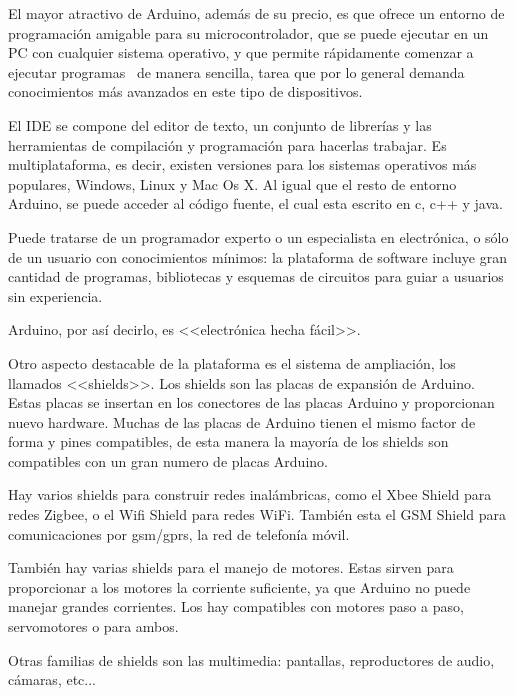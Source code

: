 El mayor atractivo de Arduino, además de su precio, es que ofrece un entorno de programación amigable para su microcontrolador, que se puede ejecutar en un PC con cualquier sistema operativo, y que permite rápidamente comenzar a ejecutar programas \ de manera sencilla, tarea que por lo general demanda conocimientos más avanzados en este tipo de dispositivos. 



El IDE se compone del editor de texto, un conjunto de librerías y las herramientas de compilación y programación para hacerlas trabajar. Es multiplataforma, es decir, existen versiones para los sistemas operativos más populares, Windows, Linux y Mac Os X. Al igual que el resto de entorno Arduino, se puede acceder al código fuente, el cual esta escrito en c, c++ y java.



Puede tratarse de un programador experto o un especialista en electrónica, o sólo de un usuario con conocimientos mínimos: la plataforma de software incluye gran cantidad de programas, bibliotecas y esquemas de circuitos para guiar a usuarios sin experiencia. 



Arduino, por así decirlo, es <<electrónica hecha fácil>>.



Otro aspecto destacable de la plataforma es el sistema de ampliación, los llamados <<shields>>. Los shields son las placas de expansión de Arduino. Estas placas se insertan en los conectores de las placas Arduino y proporcionan nuevo hardware. Muchas de las placas de Arduino tienen el mismo factor de forma y pines compatibles, de esta manera la mayoría de los shields son compatibles con un gran numero de placas Arduino.



Hay varios shields para construir redes inalámbricas, como el Xbee Shield para redes Zigbee, o el Wifi Shield para redes WiFi. También esta el GSM Shield para comunicaciones por gsm/gprs, la red de telefonía móvil.



También hay varias shields para el manejo de motores. Estas sirven para proporcionar a los motores la corriente suficiente, ya que Arduino no puede manejar grandes corrientes. Los hay compatibles con motores paso a paso, servomotores o para ambos.



Otras familias de shields son las multimedia: pantallas, reproductores de audio, cámaras, etc...


